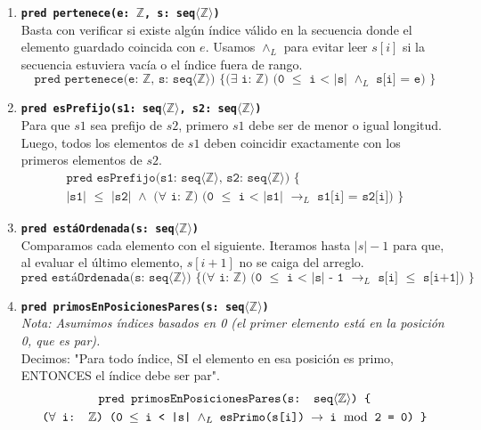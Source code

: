 \begin{enumerate}[label=\textbf{\alph*)}]

    \item \textbf{\texttt{pred pertenece(e: $\mathbb{Z}$, s: seq$\langle\mathbb{Z}\rangle$)}} \\
    Basta con verificar si existe algún índice válido en la secuencia donde el elemento guardado coincida con $e$. Usamos $\wedge_L$ para evitar leer $s[i]$ si la secuencia estuviera vacía o el índice fuera de rango.
    \[ \texttt{pred pertenece(e: $\mathbb{Z}$, s: seq$\langle\mathbb{Z}\rangle$) \{ ($\exists$ i: $\mathbb{Z}$) (0 $\leq$ i < |s| $\wedge_L$ s[i] = e) \}} \]

    \vspace{0.4cm}
    \item \textbf{\texttt{pred esPrefijo(s1: seq$\langle\mathbb{Z}\rangle$, s2: seq$\langle\mathbb{Z}\rangle$)}} \\
    Para que $s1$ sea prefijo de $s2$, primero $s1$ debe ser de menor o igual longitud. Luego, todos los elementos de $s1$ deben coincidir exactamente con los primeros elementos de $s2$.
    \begin{multline*}
    \texttt{pred esPrefijo(s1: seq$\langle\mathbb{Z}\rangle$, s2: seq$\langle\mathbb{Z}\rangle$) \{} \\
    \texttt{|s1| $\leq$ |s2| $\wedge$ ($\forall$ i: $\mathbb{Z}$) (0 $\leq$ i < |s1| $\rightarrow_L$ s1[i] = s2[i]) \}}
    \end{multline*}

    \vspace{0.4cm}
    \item \textbf{\texttt{pred estáOrdenada(s: seq$\langle\mathbb{Z}\rangle$)}} \\
    Comparamos cada elemento con el siguiente. Iteramos hasta $|s| - 1$ para que, al evaluar el último elemento, $s[i+1]$ no se caiga del arreglo.
    \[ \texttt{pred estáOrdenada(s: seq$\langle\mathbb{Z}\rangle$) \{ ($\forall$ i: $\mathbb{Z}$) (0 $\leq$ i < |s| - 1 $\rightarrow_L$ s[i] $\leq$ s[i+1]) \}} \]

    \vspace{0.4cm}
    \item \textbf{\texttt{pred primosEnPosicionesPares(s: seq$\langle\mathbb{Z}\rangle$)}} \\
    \textit{Nota: Asumimos índices basados en 0 (el primer elemento está en la posición 0, que es par).} \\
    Decimos: "Para todo índice, SI el elemento en esa posición es primo, ENTONCES el índice debe ser par".
    \begin{multline*}
    \texttt{pred primosEnPosicionesPares(s: seq$\langle\mathbb{Z}\rangle$) \{} \\
    \texttt{($\forall$ i: $\mathbb{Z}$) (0 $\leq$ i < |s| $\wedge_L$ esPrimo(s[i]) $\rightarrow$ i $\bmod$ 2 = 0) \}}
    \end{multline*}


\end{enumerate}
